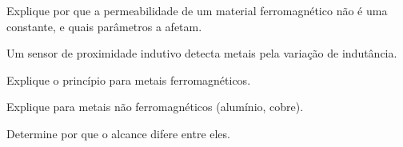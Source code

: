 \begin{questao}[3]{}

Explique por que a permeabilidade de um material ferromagnético não é uma
constante, e quais parâmetros a afetam.


\end{questao}
\begin{questao}[3]{}

Um sensor de proximidade indutivo detecta metais pela variação de indutância.
\begin{itensq}
\item Explique o princípio para metais ferromagnéticos.
\item Explique para metais não ferromagnéticos (alumínio, cobre).
\item Determine por que o alcance difere entre eles.
\end{itensq}


\end{questao}


